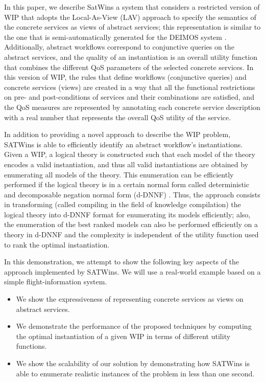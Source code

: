 \documentclass{llncs}
\begin{document}
In this paper, we describe SatWins a system that considers
 a restricted version of WIP that adopts
the Local-As-View (LAV) approach \cite{levy:bucket} to specify the semantics of the concrete services as views of abstract services; this representation is similar to the
one that is semi-automatically generated for the DEIMOS system
\cite{AmbiteISWC09}. Additionally,  abstract workflows correspond  to conjunctive
queries on the abstract services, and  the quality
of an instantiation is an overall utility function that combines the
different QoS parameters of the selected concrete services.
In this version of WIP, the rules that define workflows (conjunctive queries)
and concrete services (views) are created in a way that all the 
functional restrictions on pre- and post-conditions of services
and their combinations are satisfied, and the QoS measures are
represented by annotating each concrete service description with
a real number that represents the overall QoS utility of the service.

In addition to providing a novel approach to describe the WIP problem, SATWins is able to  efficiently identify an abstract workflow's instantiations. 
Given a WIP, a logical theory is constructed such that each model of
the theory encodes a valid instantiation, and thus all valid instantiations
are obtained by enumerating all models of the theory. This enumeration
can be efficiently performed if the logical theory is in a certain 
normal form called deterministic and decomposable negation normal
form (d-DNNF) \cite{darwiche:d-dnnfs}. Thus, the approach consists in
transforming (called compiling in the field of knowledge compilation)
the logical theory into d-DNNF format for enumerating its models efficiently; also, the  enumeration  of
the best ranked models can also be performed efficiently on a theory in d-DNNF and
the complexity is independent of the utility function used to rank the optimal instantiation.

In this demonstration, we  attempt to show the following key aspects of the approach implemented by SATWins. We will use a real-world example based on a simple flight-information system.
\begin{itemize}
\item We show the expressiveness of representing concrete services as views on abstract services.
\item We demonstrate the performance of the proposed techniques by computing the optimal instantiation of a given WIP in terms of different utility functions.  
\item We show the scalability of our solution by demonstrating how SATWins is able to enumerate realistic instances of the problem in less than one second.
\end{itemize}  
 
\end{document}

